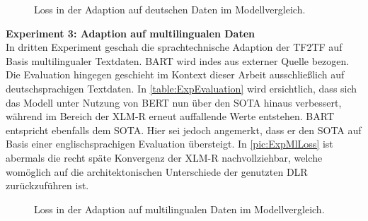\begin{figure}[h]
  \centering
  \caption{Loss in der Adaption auf deutschen Daten im Modellvergleich.}
  \label{pic:ExpDeLoss}
\end{figure}

\noindent
\textbf{Experiment 3: Adaption auf multilingualen Daten}\\
\noindent
In dritten Experiment geschah die sprachtechnische Adaption der \ac{TF2TF} auf Basis multilingualer Textdaten. \ac{BART} wird indes aus externer Quelle bezogen. Die Evaluation hingegen geschieht im Kontext dieser Arbeit ausschließlich auf deutschsprachigen Textdaten. In \autoref{table:ExpEvaluation} wird ersichtlich, dass sich das Modell unter Nutzung von \ac{BERT} nun über den \ac{SOTA} hinaus verbessert, während im Bereich der \ac{XLM-R} erneut auffallende Werte entstehen. \ac{BART} entspricht ebenfalls dem \ac{SOTA}. Hier sei jedoch angemerkt, dass er den \ac{SOTA} auf Basis einer englischsprachigen Evaluation übersteigt. In \autoref{pic:ExpMlLoss} ist abermals die recht späte Konvergenz der \ac{XLM-R} nachvollziehbar, welche womöglich auf die architektonischen Unterschiede der genutzten \ac{DLR} zurückzuführen ist.\\

\begin{figure}[h]
  \centering
  \caption{Loss in der Adaption auf multilingualen Daten im Modellvergleich.}
  \label{pic:ExpMlLoss}
\end{figure}
\newpage


